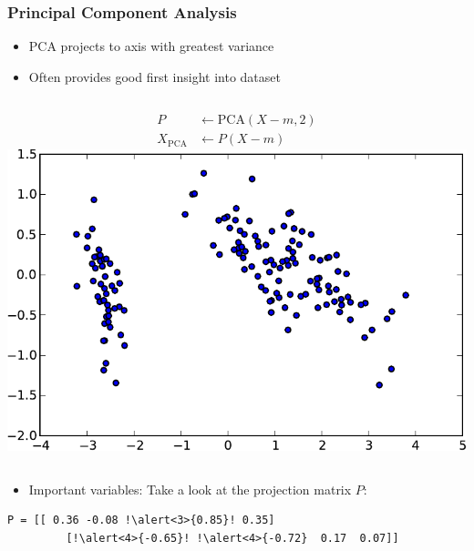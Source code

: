 \begin{frame}[fragile]
  \frametitle{Principal Component Analysis}
  \begin{itemize}
  \item PCA projects to axis with greatest \alert{variance}
  \item Often provides good \alert{first insight} into dataset
  \end{itemize}

  \begin{columns}
    \begin{align*}
        P &\leftarrow \mathrm{PCA}(X-m, 2)\\
        X_{\mathrm{PCA}} & \leftarrow P (X-m)
    \end{align*}
    \includegraphics[width=.99\linewidth]{pca-pics/iris-2d-nocolor}
  \end{columns}

  \pause
  \begin{itemize}
  \item Important variables: Take a look at the projection matrix $P$:
  \end{itemize}

  \begin{lstlisting}[escapechar=!]
    P = [[ 0.36 -0.08 !\alert<3>{0.85}! 0.35]
         [!\alert<4>{-0.65}! !\alert<4>{-0.72}  0.17  0.07]]
  \end{lstlisting}
\end{frame}

